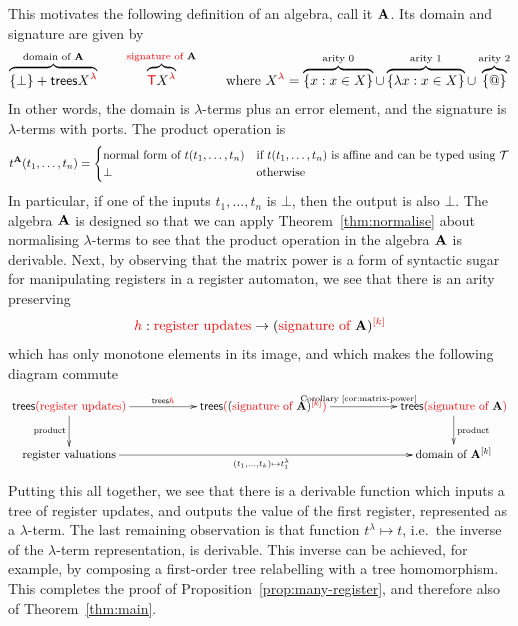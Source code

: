 This motivates the  following definition of an algebra, call it $\alg$. Its domain and signature are given by 
\begin{align*}
\overbrace{\set \bot + \trees \lamrank X}^{\algdom \alg}  \qquad \overbrace{ \tmonad \lamrank X}^{\algops \alg} \qquad \text{where }\lamrank X = {\overbrace{\set{x : x \in X}}^{\text{arity 0}} \cup \overbrace{\set{\lambda x : x \in X}}^{\text{arity 1}} \cup  \overbrace{\set @}^{\text{arity 2}}}
\end{align*}
In other words, the domain is $\lambda$-terms plus an error element, and the signature is $\lambda$-terms  with ports. The   product operation is 
\begin{align*}
t^\alg(t_1,\ldots,t_n) = \begin{cases}
    \text{normal form of $t(t_1,\ldots,t_n)$} & \text{if $t(t_1,\ldots,t_n)$ is affine and can be typed using $\Tt$}\\
    \bot & \text{otherwise}
\end{cases}
\end{align*}
In particular, if one of the inputs $t_1,\ldots,t_n$ is $\bot$, then the output is also $\bot$.  The algebra $\alg$ is designed so that we can apply Theorem~\ref{thm:normalise} about normalising $\lambda$-terms to see that the  product operation in the  algebra $\alg$ is derivable. Next, by observing that the matrix power is a form of syntactic sugar for manipulating registers in a register automaton, we see that there is an arity preserving 
    \begin{align*}
    \ranked h : \regups \to \mati k {(\algops \alg)}
    \end{align*}
    which has only monotone elements in its image, and which makes the following diagram commute
    \begin{align*}
    \xymatrix@C=2cm{
        \treepar {\regups} \ar[r]^-{\trees \ranked h}\ar[d]_{\text{product}} &
         \treepar {\mati k {(\algops \alg)}}\ar[r]^{\text{Corollary~\ref{cor:matrix-power}}}  & 
         \treepar {\algops \alg} \ar[d]^{\text{product}} \\
        \regvalss \ar[rr]_{(t_1,\ldots,t_k) \mapsto t^\lambda_1}&  & \algdom {\alg^{[k]}}
    }
    \end{align*} 
Putting this all together, we see that there is a derivable function which inputs a tree of register updates, and outputs the value of the first register, represented as a $\lambda$-term. The last remaining observation is that function $t^\lambda \mapsto t$, i.e.~the inverse of the $\lambda$-term representation, is derivable. This inverse can be achieved, for example, by composing a first-order tree relabelling with a tree homomorphism. This completes the proof of Proposition~\ref{prop:many-register}, and therefore also of Theorem~\ref{thm:main}. 